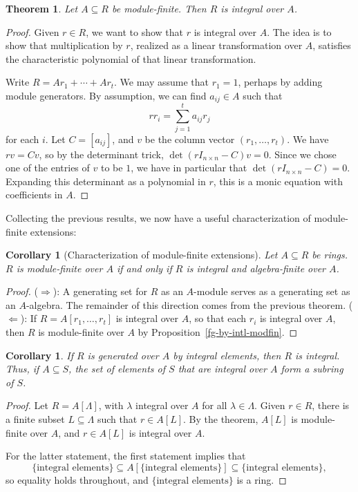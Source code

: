 \documentclass{amsart}[12pt]
\numberwithin{equation}{section}
\theoremstyle{plain} %
\newtheorem{theorem}[equation]{Theorem}
\newtheorem{corollary}[equation]{Corollary}
\theoremstyle{definition}
\theoremstyle{remark}
\begin{document}
\begin{theorem}
	Let $A\subseteq R$ be module-finite. Then $R$ is integral over $A$.
\end{theorem}
\begin{proof} Given $r\in R$, we want to show that $r$ is integral over $A$. The idea is to show that multiplication by $r$, realized as a linear transformation over $A$, satisfies the characteristic polynomial of that linear transformation.
	
	Write $R = A r_1 + \cdots + A r_t$. We may assume that $r_1=1$, perhaps by adding module generators. By assumption, we can find $a_{ij}\in A$ such that \[ r r_i = \sum_{j=1}^t a_{ij} r_j \] for each $i$. Let $C=[a_{ij}]$, and $v$ be the column vector $(r_1,\dots,r_t)$. We have $r  v = C v$, so by the determinant trick, $\det(r I_{n\times n} - C)v=0$. Since we chose one of the entries of $v$ to be $1$, we have in particular that $\det(r I_{n\times n} - C)=0$. Expanding this determinant as a polynomial in $r$, this is a monic equation with coefficients in $A$.
\end{proof}

Collecting the previous results, we now have a useful characterization of module-finite extensions:

\begin{corollary}[Characterization of module-finite extensions]\label{characterization of mod-fin alg-fin integral}
	Let $A\subseteq R$ be rings. $R$ is module-finite over $A$ if and only if $R$ is integral and algebra-finite over $A$.
\end{corollary}
\begin{proof}
	($\Rightarrow$): A generating set for $R$ as an $A$-module serves as a generating set as an $A$-algebra. The remainder of this direction comes from the previous theorem.
	($\Leftarrow$): If $R=A[r_1,\dots,r_t]$ is integral over $A$, so that each $r_i$ is integral over $A$, then $R$ is module-finite over $A$ by Proposition~\ref{fg-by-intl-modfin}.
\end{proof}


\begin{corollary}
	If $R$ is generated over $A$ by integral elements, then $R$ is integral. Thus, if $A\subseteq S$, the set of elements of $S$ that are integral over $A$ form a subring of $S$.
\end{corollary}
\begin{proof}
	Let $R=A[\Lambda]$, with $\lambda$ integral over $A$ for all $\lambda\in\Lambda$. Given $r\in R$, there is a finite subset $L\subseteq \Lambda$ such that $r\in A[L]$. By the theorem, $A[L]$ is module-finite over $A$, and $r\in A[L]$ is integral over $A$.
	
	For the latter statement, the first statement implies that
	\[ \{\text{integral elements}\} \subseteq A[\{\text{integral elements}\}] \subseteq \{\text{integral elements}\}, \] so equality holds throughout, and $\{\text{integral elements}\}$ is a ring.
\end{proof}
\end{document}
